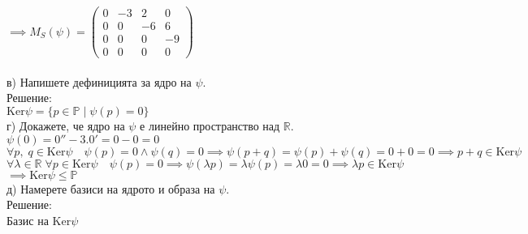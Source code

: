 \documentclass[12pt]{article}
\newcommand{\R}{\mathbb{R}}
\begin{document}
$\implies M_S(\psi) = \begin{pmatrix}
    0 & -3 &  2 &  0 \\
    0 &  0 & -6 &  6 \\
    0 &  0 &  0 & -9 \\
    0 &  0 &  0 &  0
\end{pmatrix}$ \\\\

в) Напишете дефиницията за ядро на $\psi$. \\

Решение: \\

$\mathrm{Ker}\psi = \{p \in \mathbb{P} \; | \; \psi(p) = 0\}$ \\

г) Докажете, че ядро на $\psi$ е линейно пространство над $\R$. \\

$\psi(0) = 0'' - 3.0' = 0 - 0 = 0$ \\

$\forall p, \; q \in \mathrm{Ker}\psi \quad \psi(p) = 0 \land \psi(q) = 0 \implies \psi(p + q) = \psi(p) + \psi(q) = 0 + 0 = 0 \implies p + q \in \mathrm{Ker}\psi$ \\

$\forall \lambda \in \R \; \forall p \in \mathrm{Ker}\psi \quad \psi(p) = 0 \implies \psi(\lambda p) = \lambda \psi(p) = \lambda 0 = 0 \implies \lambda p \in \mathrm{Ker}\psi$ \\

$\implies \mathrm{Ker}\psi \leq \mathbb{P}$ \\

д) Намерете базиси на ядрото и образа на $\psi$. \\

Решение: \\

Базис на $\mathrm{Ker}\psi$ \\
\end{document}
